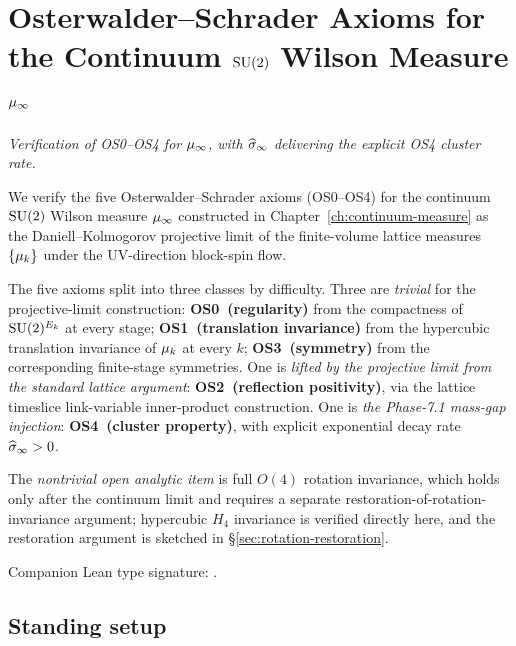 %

\chapter{Osterwalder--Schrader Axioms for the
  Continuum \texorpdfstring{$\mathrm{SU}(2)$}{SU(2)} Wilson Measure
  \texorpdfstring{$\mu_\infty$}{mu\_infinity}}
\label{ch:os-axioms}

\noindent\emph{Verification of OS0--OS4 for $\mu_\infty$, with $\widehat{\sigma}_\infty$
delivering the explicit OS4 cluster rate.}

We verify the five Osterwalder--Schrader axioms (OS0--OS4) for the
continuum $\mathrm{SU}(2)$ Wilson measure $\mu_\infty$ constructed in
Chapter~\ref{ch:continuum-measure} as the
Daniell--Kolmogorov projective limit of the finite-volume lattice
measures $\{\mu_k\}$ under the UV-direction block-spin flow.

The five axioms split into three classes by difficulty.  Three are
\emph{trivial} for the projective-limit construction:
\textbf{OS0~(regularity)} from the compactness of $\mathrm{SU}(2)^{E_k}$ at
every stage; \textbf{OS1~(translation invariance)} from the
hypercubic translation invariance of $\mu_k$ at every $k$;
\textbf{OS3~(symmetry)} from the corresponding finite-stage
symmetries.  One is \emph{lifted by the projective limit from the
standard lattice argument}: \textbf{OS2~(reflection positivity)},
via the lattice timeslice link-variable inner-product
construction.  One is \emph{the Phase-7.1 mass-gap injection}:
\textbf{OS4~(cluster property)}, with explicit exponential decay
rate $\widehat{\sigma}_\infty > 0$.

The \emph{nontrivial open analytic item} is full $O(4)$ rotation
invariance, which holds only after the continuum limit and requires
a separate restoration-of-rotation-invariance argument; hypercubic
$H_4$ invariance is verified directly here, and the restoration
argument is sketched in \S\ref{sec:rotation-restoration}.

Companion Lean type signature:
.

\section{Standing setup}
\label{sec:os-axioms-setup}


